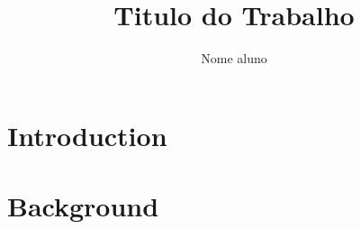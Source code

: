\documentclass{packages/quali}
\author{Nome aluno}
\title{Titulo do Trabalho}
\begin{document}
\capa
\doublespacing%
\newpage



%
%
%  
%
%
%
%
%
%

\section{Introduction}
\label{chap:introduction}


\pagebreak
\section{Background}
\label{chap:background}


\pagebreak


\pagebreak
\pagebreak

%



\end{document}
